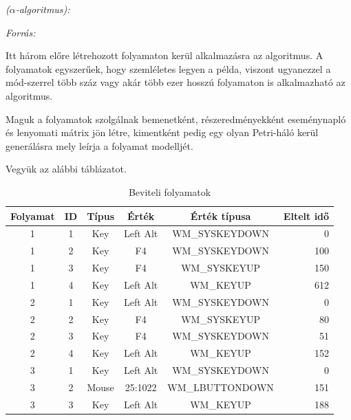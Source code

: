 \begin{definition}{\textit{($\alpha$-algoritmus):}}
\begin{enumerate}
\end{enumerate}

\textit{Forrás: \cite{article:001}}
\end{definition}

\begin{example}
	Itt három előre létrehozott folyamaton kerül alkalmazásra az algoritmus. A folyamatok egyszerűek, hogy szemléletes legyen a példa, viszont ugyanezzel a mód\hyp{}szerrel több száz vagy akár több ezer hosszú folyamaton is alkalmazható az algoritmus.
	
	Maguk a folyamatok szolgálnak bemenetként, részeredményekként eseménynapló és lenyomati mátrix jön létre, kimentként pedig egy olyan Petri-háló kerül generálásra mely leírja a folyamat modelljét.

	Vegyük az alábbi táblázatot.
	\newpage

	\begin{table}[h!]
	\begin{center}
	\caption{Beviteli folyamatok}
	\begin{tabular}{|| c | c | c | c | c | r ||}
		\hline\hline
		\textbf{Folyamat} & \textbf{ID} & \textbf{Típus} & \textbf{Érték} & \textbf{Érték típusa} &  \textbf{Eltelt idő} \\ [0.5ex]
		\hline\hline
		1 & 1 & Key&  Left Alt & WM\_SYSKEYDOWN & 0 \\
		\hline
		1 & 2 & Key&  F4 & WM\_SYSKEYDOWN & 100 \\
		\hline
		1 & 3 & Key&  F4 & WM\_SYSKEYUP & 150 \\
		\hline
		1 & 4 & Key&  Left Alt & WM\_KEYUP & 612 \\
		\hline\hline
		2 & 1 & Key & Left Alt & WM\_SYSKEYDOWN & 0 \\
		\hline
		2 & 2 & Key & F4 & WM\_SYSKEYUP & 80 \\
		\hline
		2 & 3 & Key & F4 & WM\_SYSKEYDOWN & 51 \\
		\hline
		2 & 4 & Key & Left Alt & WM\_KEYUP & 152 \\
		\hline\hline
		3 & 1 & Key & Left Alt & WM\_SYSKEYDOWN & 0 \\
		\hline
		3 & 2 & Mouse & 25:1022 & WM\_LBUTTONDOWN & 151 \\
		\hline
		3 & 3 & Key & Left Alt & WM\_KEYUP & 188 \\
		\hline\hline
	\end{tabular}
	\label{fig:planexample}
	\end{center}
	\end{table}	


\end{example}
